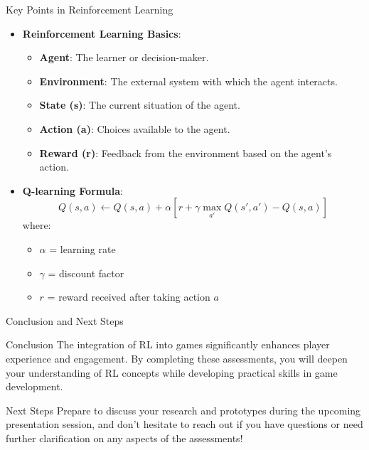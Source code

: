 \documentclass[aspectratio=169]{beamer}
\begin{document}
\begin{frame}[fragile]{Key Points in Reinforcement Learning}
    \begin{itemize}
        \item \textbf{Reinforcement Learning Basics}:
            \begin{itemize}
                \item \textbf{Agent}: The learner or decision-maker.
                \item \textbf{Environment}: The external system with which the agent interacts.
                \item \textbf{State (s)}: The current situation of the agent.
                \item \textbf{Action (a)}: Choices available to the agent.
                \item \textbf{Reward (r)}: Feedback from the environment based on the agent's action.
            \end{itemize}
            
        \item \textbf{Q-learning Formula}:
            \begin{equation}
                Q(s, a) \leftarrow Q(s, a) + \alpha \left[ r + \gamma \max_{a'} Q(s', a') - Q(s, a) \right]
            \end{equation}
            where:
            \begin{itemize}
                \item \( \alpha \) = learning rate
                \item \( \gamma \) = discount factor
                \item \( r \) = reward received after taking action \( a \)
            \end{itemize}
    \end{itemize}
\end{frame}

\begin{frame}[fragile]{Conclusion and Next Steps}
    \begin{block}{Conclusion}
        The integration of RL into games significantly enhances player experience and engagement. By completing these assessments, you will deepen your understanding of RL concepts while developing practical skills in game development.
    \end{block}
    
    \begin{block}{Next Steps}
        Prepare to discuss your research and prototypes during the upcoming presentation session, and don't hesitate to reach out if you have questions or need further clarification on any aspects of the assessments!
    \end{block}
\end{frame}
\end{document}
